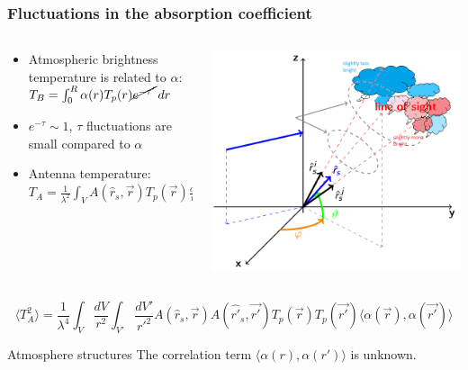 \documentclass[aspectratio=169]{beamer}
\begin{document}
\begin{frame}
    \frametitle{Fluctuations in the absorption coefficient}
    \begin{columns}
        \begin{column}{0.65\textwidth}
            \begin{itemize}[<+->]
                \item Atmospheric brightness temperature is related to $\alpha$:  {$T_B=\int_0^R\alpha(r)T_p(r)\cancel{e^{-\tau'}}\,dr$}
                \item $e^{-\tau} \sim 1$, $\tau$ fluctuations are small compared to $\alpha$
                \item Antenna temperature: $T_A = \frac{1}{\lambda^2}\int_V A(\hat{r}_s, \vec{r})T_p(\vec{r})\frac{dV}{r^2}$
            \end{itemize}
        \end{column}
        \begin{column}{0.35\textwidth}
            \includegraphics[scale=0.2]{Atmosphere.png}
        \end{column}
    \end{columns}

    \begin{equation}
        \langle T_A^2 \rangle = \frac{1}{\lambda^4}\int_V \frac{dV}{r^2}\int_{V'}\frac{dV'}{r'^2} A(\hat{r}_s, \vec{r})A(\hat{r'}_s, \vec{r'})T_p(\vec{r})T_p(\vec{r'})\langle\alpha(\vec{r}), \alpha(\vec{r'})\rangle\nonumber
    \end{equation}

    \begin{alertblock}{Atmosphere structures}
        \centering
        The correlation term $\langle\alpha(r), \alpha(r')\rangle$ is unknown.
    \end{alertblock}

\end{frame}
\end{document}
